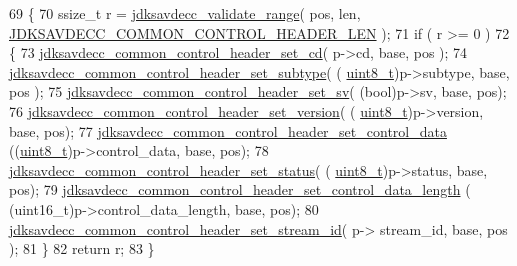 \begin{DoxyCode}
69 \{
70     ssize\_t r = \hyperlink{group__util_ga9c02bdfe76c69163647c3196db7a73a1}{jdksavdecc\_validate\_range}( pos, len, 
      \hyperlink{group__jdksavdecc__avtp__common__control__header_gaae84052886fb1bb42f3bc5f85b741dff}{JDKSAVDECC\_COMMON\_CONTROL\_HEADER\_LEN} );
71     \textcolor{keywordflow}{if} ( r >= 0 )
72     \{
73         \hyperlink{group__jdksavdecc__avtp__common__control__header_ga25637b3f3eeae369125694cd5692e606}{jdksavdecc\_common\_control\_header\_set\_cd}( p->cd, base, pos );
74         \hyperlink{group__jdksavdecc__avtp__common__control__header_ga4418723fafa2bb29fdd1237f17b0a150}{jdksavdecc\_common\_control\_header\_set\_subtype}( (
      \hyperlink{stdint_8h_aba7bc1797add20fe3efdf37ced1182c5}{uint8\_t})p->subtype, base, pos );
75         \hyperlink{group__jdksavdecc__avtp__common__control__header_ga8f4004578afa74518bedc4545cf437bb}{jdksavdecc\_common\_control\_header\_set\_sv}( (\textcolor{keywordtype}{bool})p->sv, base, 
      pos);
76         \hyperlink{group__jdksavdecc__avtp__common__control__header_ga8ae4ee3ac7223ea2ccbea0c94af25dc0}{jdksavdecc\_common\_control\_header\_set\_version}( (
      \hyperlink{stdint_8h_aba7bc1797add20fe3efdf37ced1182c5}{uint8\_t})p->version, base, pos);
77         \hyperlink{group__jdksavdecc__avtp__common__control__header_gaaa8fc67df8a6ca2ae198b00d444c2d02}{jdksavdecc\_common\_control\_header\_set\_control\_data} 
      ((\hyperlink{stdint_8h_aba7bc1797add20fe3efdf37ced1182c5}{uint8\_t})p->control\_data, base, pos);
78         \hyperlink{group__jdksavdecc__avtp__common__control__header_ga1eb286068111e77cc1088b32a7517d76}{jdksavdecc\_common\_control\_header\_set\_status}( (
      \hyperlink{stdint_8h_aba7bc1797add20fe3efdf37ced1182c5}{uint8\_t})p->status, base, pos);
79         \hyperlink{group__jdksavdecc__avtp__common__control__header_ga69f3cbdf2665d0649d4669b2b5d07b61}{jdksavdecc\_common\_control\_header\_set\_control\_data\_length}
      ( (uint16\_t)p->control\_data\_length, base, pos);
80         \hyperlink{group__jdksavdecc__avtp__common__control__header_ga162c572e62c324dab4911f46e750e261}{jdksavdecc\_common\_control\_header\_set\_stream\_id}( p->
      stream\_id, base, pos );
81     \}
82     \textcolor{keywordflow}{return} r;
83 \}
\end{DoxyCode}


